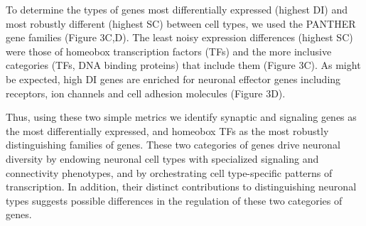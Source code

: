 To determine the types of genes most differentially expressed (highest DI) and most robustly different (highest SC) between cell types, we used the PANTHER gene families \citep{Mi_2016} (Figure 3C,D). The least noisy expression differences (highest SC) were those of homeobox transcription factors (TFs) and the more inclusive categories (TFs, DNA binding proteins) that include them (Figure 3C). As might be expected, high DI genes are enriched for neuronal effector genes including receptors, ion channels and cell adhesion molecules (Figure 3D). 

Thus, using these two simple metrics we identify synaptic and signaling genes as the most differentially expressed, and homeobox TFs as the most robustly distinguishing families of genes. These two categories of genes drive neuronal diversity by endowing neuronal cell types with specialized signaling and connectivity phenotypes, and by orchestrating cell type-specific patterns of transcription. In addition, their distinct contributions to distinguishing neuronal types suggests possible differences in the regulation of these two categories of genes. 


